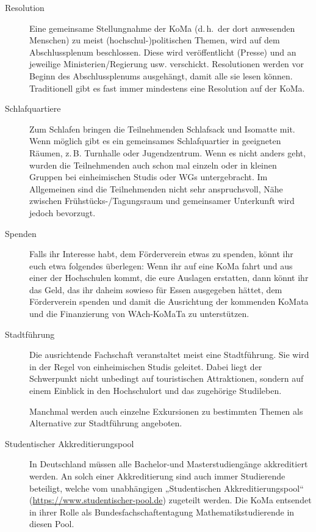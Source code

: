 \begin{description}
\item[Resolution]
    Eine gemeinsame Stellungnahme der KoMa (d.\,h.\ der dort anwesenden Menschen) zu meist (hochschul-)politischen Themen, wird auf dem Abschlussplenum beschlossen.
    Diese wird veröffentlicht (Presse) und an jeweilige Ministerien/Regierung usw. verschickt.
    Resolutionen werden vor Beginn des Abschlussplenums ausgehängt, damit alle sie lesen können. Traditionell gibt es fast immer mindestens eine Resolution auf der KoMa.

\item[Schlafquartiere]
    Zum Schlafen bringen die Teilnehmenden Schlafsack und Isomatte mit. Wenn möglich gibt es ein gemeinsames Schlafquartier in geeigneten Räumen, z.\,B. Turnhalle oder Jugendzentrum. Wenn es nicht anders geht, wurden die Teilnehmenden auch schon mal einzeln oder in kleinen Gruppen bei einheimischen Studis oder WGs untergebracht. 
    Im Allgemeinen sind die Teilnehmenden nicht sehr anspruchsvoll, Nähe zwischen Frühstücks-/Tagungsraum und gemeinsamer Unterkunft wird jedoch bevorzugt.

\item[Spenden]
    Falls ihr Interesse habt, dem Förderverein etwas zu spenden, könnt ihr euch etwa folgendes überlegen: Wenn ihr auf eine KoMa fahrt und aus einer der Hochschulen kommt, die eure Auslagen erstatten, dann könnt ihr das Geld, das ihr daheim sowieso für Essen ausgegeben hättet, dem Förderverein spenden und damit die Ausrichtung der kommenden KoMata und die Finanzierung von WAch-KoMaTa zu unterstützen.

\item[Stadtführung]
    Die ausrichtende Fachschaft veranstaltet meist eine Stadtführung. Sie wird in der Regel von einheimischen Studis geleitet. Dabei liegt der Schwerpunkt nicht unbedingt auf touristischen Attraktionen, sondern auf einem Einblick in den Hochschulort und das zugehörige Studileben.
    
    Manchmal werden auch einzelne Exkursionen zu bestimmten Themen als Alternative zur Stadtführung angeboten.

\item[Studentischer Akkreditierungspool]\label{itm:pool}
    In Deutschland müssen alle Bachelor-und Masterstudiengänge akkreditiert werden. An solch einer Akkreditierung sind auch immer Studierende beteiligt, welche vom unabhängigen „Studentischen Akkreditierungspool“ (\url{https://www.studentischer-pool.de}) zugeteilt werden. Die KoMa entsendet in ihrer Rolle als Bundesfachschaftentagung Mathematikstudierende in diesen Pool.


\end{description}
